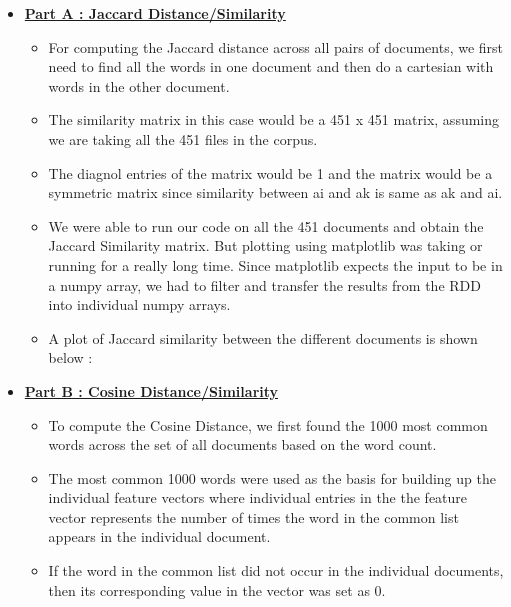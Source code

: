 \documentclass[11pt]{article}
\begin{document}
\begin{itemize}
\item[] \textbf{\underline{Part A : Jaccard Distance/Similarity}} 

\begin{itemize}

\item[] For computing the Jaccard distance across all pairs of documents, we first need to find all the words in one document and then do a cartesian with words in the other document.

\item[] The similarity matrix in this case would be a 451 x 451 matrix, assuming we are taking all the 451 files in the corpus.

\item[] The diagnol entries of the matrix would be 1 and the matrix would be a symmetric matrix since similarity between ai and ak is same as ak and ai.

\item[] We were able to run our code on all the 451 documents and obtain the Jaccard Similarity matrix. But plotting using matplotlib was taking or running for a really long time. Since matplotlib expects the input to be in a numpy array, we had to filter and transfer the results from the RDD into individual numpy arrays.

\item[] A plot of Jaccard similarity between the different documents is shown below :

\end{itemize}




\item[] \textbf{\underline{Part B : Cosine Distance/Similarity}}

\begin{itemize}

\item[] To compute the Cosine Distance, we first found the 1000 most common words across the set of all documents based on the word count.

\item[] The most common 1000 words were used as the basis for building up the individual feature vectors where individual entries in the the feature vector represents the number of times the word in the common list appears in the individual document. 

\item If the word in the common list did not occur in the individual documents, then its corresponding value in the vector was set as 0.


\end{itemize}
\end{itemize}
\end{document}

